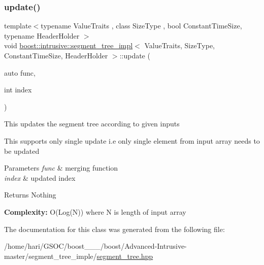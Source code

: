 \subsubsection{\texorpdfstring{update()}{update()}}
{\footnotesize\ttfamily template$<$typename Value\+Traits , class Size\+Type , bool Constant\+Time\+Size, typename Header\+Holder $>$ \\
void \hyperlink{classboost_1_1intrusive_1_1segment__tree__impl}{boost\+::intrusive\+::segment\+\_\+tree\+\_\+impl}$<$ Value\+Traits, Size\+Type, Constant\+Time\+Size, Header\+Holder $>$\+::update (\begin{DoxyParamCaption}\item[{auto}]{func,  }\item[{int}]{index }\end{DoxyParamCaption})\hspace{0.3cm}{\ttfamily [inline]}}


\begin{DoxyItemize}
\item This updates the segment tree according to given inputs  
\item This supports only single update i.\+e only single element from input array needs to be updated  
\end{DoxyItemize}
\begin{DoxyParams}{Parameters}
{\em func} & merging function \\
\hline
{\em index} & updated index \\
\hline
\end{DoxyParams}
\begin{DoxyReturn}{Returns}
Nothing 
\end{DoxyReturn}


{\bfseries  Complexity\+: } O(\+Log(\+N)) where N is length of input array 

The documentation for this class was generated from the following file\+:\begin{DoxyCompactItemize}
\item 
/home/hari/\+G\+S\+O\+C/boost\+\_\+\_\+\_/boost/\+Advanced-\/\+Intrusive-\/master/segment\+\_\+tree\+\_\+imple/\hyperlink{segment__tree_8hpp}{segment\+\_\+tree.\+hpp}\end{DoxyCompactItemize}
